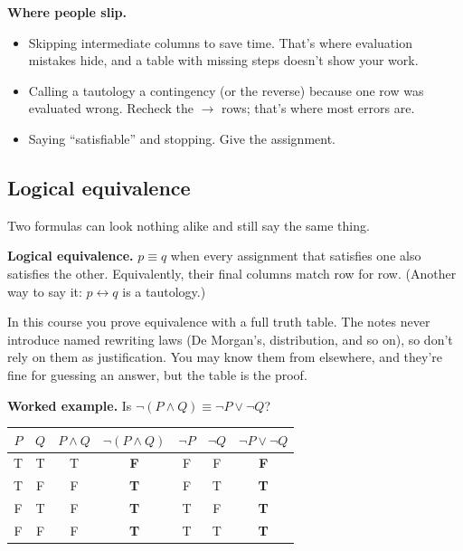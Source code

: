 \textbf{Where people slip.}
\begin{itemize}
  \item Skipping intermediate columns to save time. That's where evaluation mistakes hide, and a table with missing steps doesn't show your work.
  \item Calling a tautology a contingency (or the reverse) because one row was evaluated wrong. Recheck the $\to$ rows; that's where most errors are.
  \item Saying ``satisfiable'' and stopping. Give the assignment.
\end{itemize}

\subsection{Logical equivalence}

Two formulas can look nothing alike and still say the same thing.

\begin{notebox}
\textbf{Logical equivalence.} $p\equiv q$ when every assignment that satisfies one also satisfies the other. Equivalently, their final columns match row for row. (Another way to say it: $p\leftrightarrow q$ is a tautology.)
\end{notebox}

In this course you prove equivalence with a full truth table. The notes never introduce named rewriting laws (De Morgan's, distribution, and so on), so don't rely on them as justification. You may know them from elsewhere, and they're fine for guessing an answer, but the table is the proof.

\textbf{Worked example.} Is $\lnot(P\land Q)\equiv\lnot P\lor\lnot Q$?

\begin{center}
\begin{tabular}{cc|c>{\bfseries}c|cc>{\bfseries}c}
\toprule
$P$ & $Q$ & $P\land Q$ & $\lnot(P\land Q)$ & $\lnot P$ & $\lnot Q$ & $\lnot P\lor\lnot Q$\\
\midrule
T & T & T & F & F & F & F\\
T & F & F & T & F & T & T\\
F & T & F & T & T & F & T\\
F & F & F & T & T & T & T\\
\bottomrule
\end{tabular}
\end{center}

